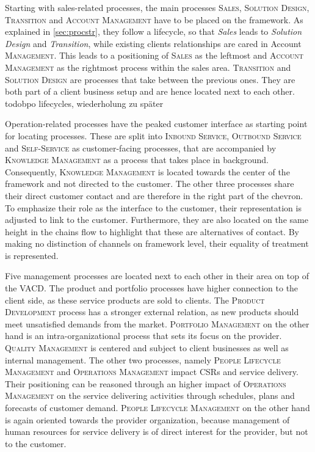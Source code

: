 	
	 Starting with sales-related processes, the main processes \textsc{Sales}, \textsc{Solution Design}, \textsc{Transition} and \textsc{Account Management} have to be placed on the framework. As explained in \ref{sec:procstr}, they follow a lifecycle, so that \textit{Sales} leads to \textit{Solution Design} and \textit{Transition}, while existing clients relationships are cared in Account \textsc{Management}. This leads to a positioning of \textsc{Sales} as the leftmost and \textsc{Account Management} as the rightmost process within the sales area. \textsc{Transition} and \textsc{Solution Design} are processes that take between the previous ones. They are both part of a client business setup and are hence located next to each other. todo{bpo lifecycles, wiederholung zu später}
	 
	 Operation-related processes have the peaked customer interface as starting point for locating processes. These are split into \textsc{Inbound Service}, \textsc{Outbound Service} and \textsc{Self-Service} as customer-facing processes, that are accompanied by \textsc{Knowledge Management} as a process that takes place in background. Consequently, \textsc{Knowledge Management} is located towards the center of the framework and not directed to the customer. The other three processes share their direct customer contact and are therefore in the right part of the chevron. To emphasize their role as the interface to the customer, their representation is adjusted to link to the customer. Furthermore, they are also located on the same height in the chains flow to highlight that these are alternatives of contact. By making no distinction of channels on framework level, their equality of treatment is represented. 
	 
	 Five management processes are located next to each other in their area on top of the \acrshort{VACD}. The product and portfolio processes have higher connection to the client side, as these service products are sold to clients. The \textsc{Product Development} process has a stronger external relation, as new products should meet unsatisfied demands from the market. \textsc{Portfolio Management} on the other hand is an intra-organizational process that sets its focus on the provider. \textsc{Quality Management} is centered and subject to client businesses as well as internal management. The other two processes, namely \textsc{People Lifecycle Management} and \textsc{Operations Management} impact \acrshort{CSR}s and service delivery. Their positioning can be reasoned through an higher impact of \textsc{Operations Management} on the service delivering activities through schedules, plans and forecasts of customer demand. \textsc{People Lifecycle Management} on the other hand is again oriented towards the provider organization, because management of human resources for service delivery is of direct interest for the provider, but not to the customer.
	 
